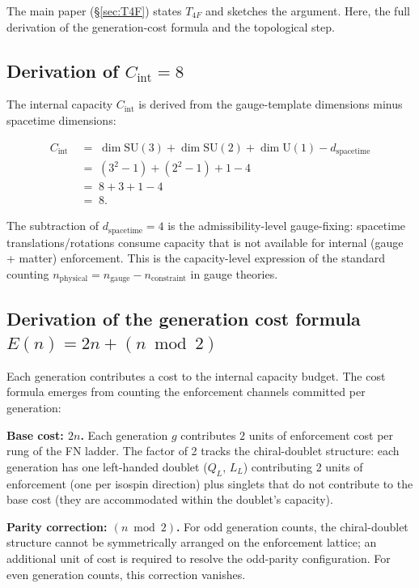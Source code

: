 \documentclass[11pt]{article}
\newcommand{\SU}{\mathrm{SU}}
\newcommand{\Un}{\mathrm{U}}
\theoremstyle{definition}
\begin{document}
The main paper (\S\ref{sec:T4F}) states $T_{4F}$ and sketches the argument. Here, the full derivation of the generation-cost formula and the topological step.

\subsection{Derivation of \texorpdfstring{$C_{\mathrm{int}} = 8$}{Cint = 8}}\label{sec:Cint_derivation}

The internal capacity $C_{\mathrm{int}}$ is derived from the gauge-template dimensions minus spacetime dimensions:

\begin{align*}
C_{\mathrm{int}}
&\;=\; \dim\SU(3) + \dim\SU(2) + \dim\Un(1) - d_{\mathrm{spacetime}} \\
&\;=\; (3^2 - 1) + (2^2 - 1) + 1 - 4 \\
&\;=\; 8 + 3 + 1 - 4 \\
&\;=\; 8.
\end{align*}

The subtraction of $d_{\mathrm{spacetime}} = 4$ is the admissibility-level gauge-fixing: spacetime translations/rotations consume capacity that is not available for internal (gauge + matter) enforcement. This is the capacity-level expression of the standard counting $n_{\mathrm{physical}} = n_{\mathrm{gauge}} - n_{\mathrm{constraint}}$ in gauge theories.

\subsection{Derivation of the generation cost formula \texorpdfstring{$E(n) = 2n + (n \bmod 2)$}{E(n) = 2n + (n mod 2)}}\label{sec:Ecost_derivation}

Each generation contributes a cost to the internal capacity budget. The cost formula emerges from counting the enforcement channels committed per generation:

\textbf{Base cost: $2n$.} Each generation $g$ contributes $2$ units of enforcement cost per rung of the FN ladder. The factor of 2 tracks the chiral-doublet structure: each generation has one left-handed doublet ($Q_L$, $L_L$) contributing 2 units of enforcement (one per isospin direction) plus singlets that do not contribute to the base cost (they are accommodated within the doublet's capacity).

\textbf{Parity correction: $(n \bmod 2)$.} For odd generation counts, the chiral-doublet structure cannot be symmetrically arranged on the enforcement lattice; an additional unit of cost is required to resolve the odd-parity configuration. For even generation counts, this correction vanishes.
\end{document}
